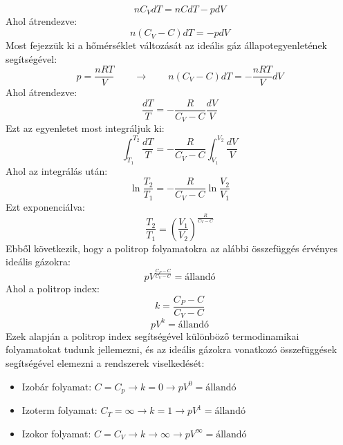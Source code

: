 \documentclass[../main.tex]{subfiles}
\begin{document}
\begin{equation}
    n C_V dT = n C dT - p dV
\end{equation}
Ahol átrendezve:
\begin{equation}
    n (C_V - C) dT = - p dV
\end{equation}
Most fejezzük ki a hőmérséklet változását az ideális gáz állapotegyenletének segítségével:
\begin{equation}
    p = \frac{nR T}{V} \qquad \to \qquad
    n (C_V - C) dT = - \frac{nR T}{V} dV
\end{equation}
Ahol átrendezve:
\begin{equation}
    \frac{dT}{T} = - \frac{R}{C_V - C} \frac{dV}{V}
\end{equation}
Ezt az egyenletet most integráljuk ki:
\begin{equation}
    \int_{T_1}^{T_2} \frac{dT}{T} = - \frac{R}{C_V - C} \int_{V_1}^{V_2} \frac{dV}{V}
\end{equation}
Ahol az integrálás után:
\begin{equation}
    \ln{\frac{T_2}{T_1}} = - \frac{R}{C_V - C} \ln{\frac{V_2}{V_1}}
\end{equation}
Ezt exponenciálva:
\begin{equation}
    \frac{T_2}{T_1} = \left(\frac{V_1}{V_2}\right)^{\frac{R}{C_V - C}}
\end{equation}
Ebből következik, hogy a politrop folyamatokra az alábbi összefüggés érvényes ideális gázokra:
\begin{equation}
    p V^{\frac{C_P - C}{C_V - C}} = \text{állandó}
\end{equation}
Ahol a politrop index:
\begin{equation}
    k = \frac{C_P - C}{C_V - C}
\end{equation}
\begin{equation}
    \boxed{p V^{k} = \text{állandó}}
\end{equation}
Ezek alapján a politrop index segítségével különböző termodinamikai folyamatokat tudunk jellemezni, és az ideális gázokra vonatkozó összefüggések segítségével elemezni a rendszerek viselkedését:
\begin{itemize}
    \item Izobár folyamat: $C = C_p \to k = 0 \to pV^0 = \text{állandó}$
    \item Izoterm folyamat: $C_T = \infty \to k = 1 \to pV^1 = \text{állandó}$
    \item Izokor folyamat: $C = C_V \to k \to \infty \to pV^{\infty} = \text{állandó}$
\end{itemize}
\end{document}
